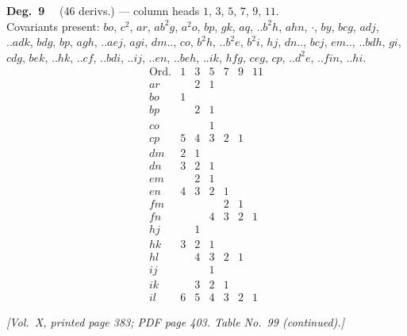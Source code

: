 \documentclass[11pt]{article}
\begin{document}
\noindent\textbf{Deg.~9} \ \ (46 derivs.) --- column heads $1$, $3$, $5$, $7$, $9$, $11$. \\
Covariants present: $bo$, $c^{2}$, $ar$, $ab^{2}g$, $a^{2}o$, $bp$, $gk$, $aq$, $..b^{2}h$, $ahn$, $\cdot$, $by$, $bcg$, $adj$, $..adk$, $bdg$, $bp$, $agh$, $..aej$, $agi$, $dm..$, $co$, $b^{2}h$, $..b^{2}e$, $b^{2}i$, $hj$, $dn..$, $bcj$, $em..$, $..bdh$, $gi$, $cdg$, $bek$, $..hk$, $..cf$, $..bdi$, $..ij$, $..en$, $..beh$, $..ik$, $hfg$, $ceg$, $cp$, $..d^{2}e$, $..fin$, $..hi$.
\[
\begin{array}{l|cccccc}
\text{Ord.} & 1 & 3 & 5 & 7 & 9 & 11 \\\hline
ar & & 2 & 1 & & & \\
bo & 1 & & & & & \\
bp & & 2 & 1 & & & \\
co & & & 1 & & & \\
cp & 5 & 4 & 3 & 2 & 1 & \\
dm & 2 & 1 & & & & \\
dn & 3 & 2 & 1 & & & \\
em & & 2 & 1 & & & \\
en & 4 & 3 & 2 & 1 & & \\
fm & & & & 2 & 1 & \\
fn & & & 4 & 3 & 2 & 1 \\
hj & & 1 & & & & \\
hk & 3 & 2 & 1 & & & \\
hl & & 4 & 3 & 2 & 1 & \\
ij & & & 1 & & & \\
ik & & 3 & 2 & 1 & & \\
il & 6 & 5 & 4 & 3 & 2 & 1
\end{array}
\]

\newpage

\noindent\textit{[Vol.~X, printed page 383; PDF page 403. Table No.~99 (continued).]}

\bigskip
\end{document}
